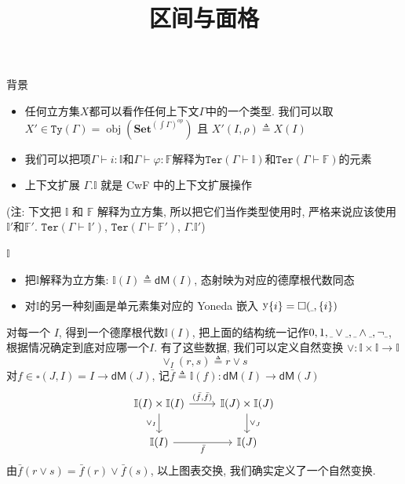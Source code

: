 \documentclass[aspectratio=169,xcolor=dvipsnames]{beamer}
\title{区间与面格}
\date{}
\newcommand\bbI{\mathbb{I}}
\newcommand\bbF{\mathbb{F}}
\newcommand\Ty{\mathtt{Ty}}
\newcommand\Ter{\mathtt{Ter}}
\newcommand\dM{\mathsf{dM}}
\newcommand\Set{\mathbf{Set}}
\newcommand{\ul}{{\scalebox{0.4}[1.0]{\_}}}
\DeclareMathOperator\obj{obj}
\DeclareMathOperator\y{y}
\begin{document}
\begin{frame}
    \titlepage
\end{frame}

\begin{frame}{背景}
\begin{itemize}
  \item 任何立方集$X$都可以看作任何上下文$\Gamma$中的一个类型. 我们可以取$X'\in\Ty(\Gamma)=\obj(\Set^{(\int\Gamma)^{op}})$ 且 $X'(I,\rho)\triangleq X(I)$
  \item 我们可以把项$\Gamma\vdash i:\bbI$和$\Gamma\vdash\varphi:\bbF$解释为$\Ter(\Gamma\vdash\bbI)$和$\Ter(\Gamma\vdash\bbF)$的元素
  \item 上下文扩展 $\Gamma.\bbI$ 就是 CwF 中的上下文扩展操作
\end{itemize}
(注: 下文把 $\bbI$ 和 $\bbF$ 解释为立方集, 所以把它们当作类型使用时, 严格来说应该使用$\bbI'$和$\bbF'$. $\Ter(\Gamma\vdash\bbI')$, $\Ter(\Gamma\vdash\bbF')$, $\Gamma.\bbI'$)
\end{frame}

\begin{frame}{$\bbI$}
  \begin{itemize}
    \item 把$\bbI$解释为立方集: $\bbI(I)\triangleq\dM(I)$, 态射映为对应的德摩根代数同态
    \item 对$\bbI$的另一种刻画是单元素集对应的 Yoneda 嵌入 $\y\{i\}=\square(\ul,\{i\})$
  \end{itemize}
  对每一个 $I$, 得到一个德摩根代数$\bbI(I)$, 把上面的结构统一记作$0,1,\ul\lor\ul,\ul\land\ul,\neg\ul$, 根据情况确定到底对应哪一个$I$. 有了这些数据, 我们可以定义自然变换 $\lor:\bbI\times\bbI\to\bbI$\[ \lor_{I}(r,s) \triangleq r \lor s \]
  对$f\in\square(J,I)=I\to\dM(J)$, 记$\bar{f}\triangleq\bbI(f):\dM(I)\to\dM(J)$
  \[
  \begin{tikzcd}
  \bbI(I)\times\bbI(I) \arrow[d,"{\lor_{I}}"'] \arrow[r,"{(\bar{f},\bar{f})}"] & \bbI(J)\times\bbI(J) \arrow[d,"{\lor_{J}}"]\\
  \bbI(I) \arrow[r,"\bar{f}"'] & \bbI(J)
  \end{tikzcd}
  \]
  由$\bar{f}(r\lor s) = \bar{f}(r)\lor\bar{f}(s)$, 以上图表交换, 我们确实定义了一个自然变换.
\end{frame}
\end{document}
